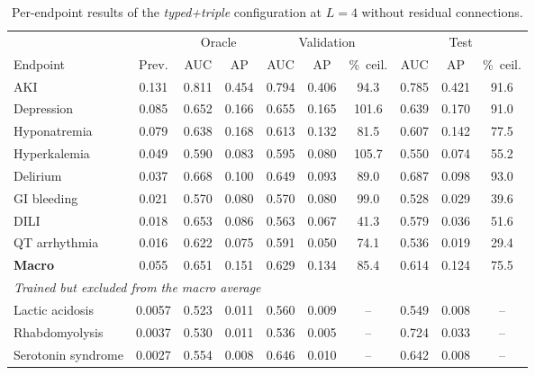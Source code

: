     \begin{table}[htbp]
      \centering
      \small
      \setlength{\tabcolsep}{4pt}
      \caption{Per-endpoint results of the \emph{typed+triple} configuration at
        $L=4$ without residual connections.}
      \label{tab:per-endpoint}
      \begin{tabular}{lccc ccc ccc}
        \toprule
        & & \multicolumn{2}{c}{Oracle} & \multicolumn{3}{c}{Validation} & \multicolumn{3}{c}{Test} \\
        \cmidrule(lr){3-4}\cmidrule(lr){5-7}\cmidrule(lr){8-10}
        Endpoint & Prev. & AUC & AP & AUC & AP & \%~ceil. & AUC & AP & \%~ceil. \\
        \midrule
        AKI                & 0.131 & 0.811 & 0.454 & 0.794 & 0.406 & 94.3  & 0.785 & 0.421 & 91.6 \\
        Depression         & 0.085 & 0.652 & 0.166 & 0.655 & 0.165 & 101.6 & 0.639 & 0.170 & 91.0 \\
        Hyponatremia       & 0.079 & 0.638 & 0.168 & 0.613 & 0.132 & 81.5  & 0.607 & 0.142 & 77.5 \\
        Hyperkalemia       & 0.049 & 0.590 & 0.083 & 0.595 & 0.080 & 105.7 & 0.550 & 0.074 & 55.2 \\
        Delirium           & 0.037 & 0.668 & 0.100 & 0.649 & 0.093 & 89.0  & 0.687 & 0.098 & 93.0 \\
        GI bleeding        & 0.021 & 0.570 & 0.080 & 0.570 & 0.080 & 99.0  & 0.528 & 0.029 & 39.6 \\
        DILI               & 0.018 & 0.653 & 0.086 & 0.563 & 0.067 & 41.3  & 0.579 & 0.036 & 51.6 \\
        QT arrhythmia      & 0.016 & 0.622 & 0.075 & 0.591 & 0.050 & 74.1  & 0.536 & 0.019 & 29.4 \\
        \midrule
        \textbf{Macro}     & 0.055 & 0.651 & 0.151 & 0.629 & 0.134 & 85.4  & 0.614 & 0.124 & 75.5 \\
        \midrule
        \multicolumn{10}{l}{\emph{Trained but excluded from the macro average}} \\
        Lactic acidosis    & 0.0057 & 0.523 & 0.011 & 0.560 & 0.009 & {--} & 0.549 & 0.008 & {--} \\
        Rhabdomyolysis     & 0.0037 & 0.530 & 0.011 & 0.536 & 0.005 & {--} & 0.724 & 0.033 & {--} \\
        Serotonin syndrome & 0.0027 & 0.554 & 0.008 & 0.646 & 0.010 & {--} & 0.642 & 0.008 & {--} \\
        \bottomrule
      \end{tabular}
    \end{table}